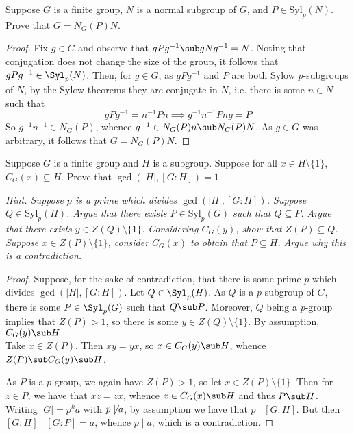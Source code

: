 \documentclass[12pt]{article}
\begin{document}
\begin{homeworkProblem}
  Suppose $G$ is a finite group, $N$ is a normal subgroup of $G$, and $P \in \mathrm{Syl}_p(N)$.  
  Prove that $G = N_G(P)N$.  


  \begin{proof}
    Fix $ g\in G $ and observe that $ gPg^{-1}\sub gNg^{-1}= N $. Noting that conjugation does not change the size of the group, it follows that $ gPg^{-1} \in \Syl_{p}(N)$. Then, for $ g\in G $, as $ gPg^{-1} $ and $ P $ are both Sylow $ p $-subgroups of $ N $, by the Sylow theorems they are conjugate in $ N $, i.e. there is some $ n\in N $ such that 
    \[
       gPg^{-1} = n^{-1}Pn \implies g^{-1}n^{-1}Png = P
    \]
    So $ g^{-1}n^{-1}\in N_{G}(P) $, whence $ g^{-1}\in N_{G}(P)n\sub N_{G}(P)N $. As $ g\in G $ was arbitrary, it follows that $ G = N_{G}(P)N $.
  \end{proof}
\end{homeworkProblem}


\begin{homeworkProblem}
  Suppose $G$ is a finite group and $H$ is a subgroup. Suppose for all $x \in H \setminus \{1\}$,  
  $C_G(x) \subseteq H$. Prove that $\gcd(\lvert H\rvert, [G : H]) = 1$.  

  \textit{Hint. Suppose $p$ is a prime which divides $\gcd(\lvert H\rvert, [G : H])$. Suppose $Q \in \mathrm{Syl}_p(H)$. Argue that there exists $P \in \mathrm{Syl}_p(G)$ such that $Q \subseteq P$. Argue that there exists $y \in Z(Q)\setminus \{1\}$. Considering $C_G(y)$, show that $Z(P) \subseteq Q$. Suppose $x \in Z(P)\setminus \{1\}$, consider $C_G(x)$ to obtain that $P \subseteq H$. Argue why this is a contradiction.}

  \begin{proof}
    Suppose, for the sake of contradiction, that there is some prime $ p $ which divides $ \gcd(|H|, [G:H]) $. Let $ Q\in \Syl_{p}(H) $. As $ Q $ is a $ p $-subgroup of $ G $, there is some $ P\in\Syl_{p}(G) $ such that $ Q\sub P $. Moreover, $ Q $ being a $ p $-group implies that $ Z(P)>1 $, so there is some $ y\in Z(Q)\setminus \{1\} $. By assumption, $ C_{G}(y)\sub H $\\

    Take $ x\in Z(P) $. Then $ xy=yx $, so $ x\in C_{G}(y)\sub H $, whence $ Z(P)\sub C_{G}(y)\sub H $.

    As $ P $ is a $ p $-group, we again have $ Z(P)>1 $, so let $ x\in Z(P)\setminus \{1\} $. Then for $ z\in P $, we have that $ xz = zx $, whence $ z\in C_{G}(x) \sub H  $ and thus $ P\sub H $.\\

    Writing $ |G| = p^{k}a $ with $ p\not\mid a $, by assumption we have that $ p\mid [G:H] $. But then $ [G:H]\mid [G:P] = a $, whence $ p\mid a $, which is a contradiction.
  \end{proof}
\end{homeworkProblem}
 
\end{document}
